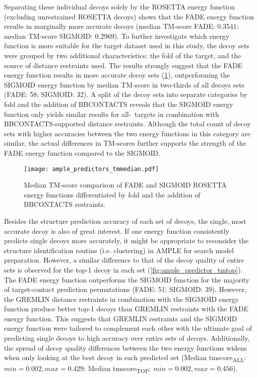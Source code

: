 Separating these individual decoys solely by the ROSETTA energy function (excluding unrestrained ROSETTA decoys) shows that the FADE energy function results in marginally more accurate decoys (median TM-score FADE: 0.3541; median TM-score SIGMOID: 0.2969). To further investigate which energy function is more suitable for the target dataset used in this study, the decoy sets were grouped by two additional characteristics: the fold of the target, and the source of distance restraints used. The results strongly suggest that the FADE energy function results in more accurate decoy sets (\cref{fig:ample_predictor_tmmedian}), outperforming the SIGMOID energy function by median TM-score in two-thirds of all decoys sets (FADE: 58; SIGMOID: 32). A split of the decoy sets into separate categories by fold and the addition of BBCONTACTS reveals that the SIGMOID energy function only yields similar results for all-\textbeta\ targets in combination with BBCONTACTS-supported distance restraints. Although the total count of decoy sets with higher accuracies between the two energy functions in this category are similar, the actual differences in TM-scores further supports the strength of the FADE energy function compared to the SIGMOID.

\begin{figure}[H]
    \centering
    \texttt{[image: ample\_predictors\_tmmedian.pdf]}
    \caption[Median TM-score comparison between ROSETTA energy functions]{Median TM-score comparison of FADE and SIGMOID ROSETTA energy functions differentiated by fold and the addition of BBCONTACTS restraints.}
    \label{fig:ample_predictor_tmmedian}
\end{figure}

Besides the structure prediction accuracy of each set of decoys, the single, most accurate decoy is also of great interest. If one energy function consistently predicts single decoys more accurately, it might be appropriate to reconsider the structure identification routine (i.e. clustering) in AMPLE for search model preparation. However, a similar difference to that of the decoy quality of entire sets is observed for the top-1 decoy in each set (\cref{fig:ample_predictor_tmtop}). The FADE energy function outperforms the SIGMOID function for the majority of target-contact prediction permutations (FADE: 51; SIGMOID: 39). However, the GREMLIN distance restraints in combination with the SIGMOID energy function produce better top-1 decoys than GREMLIN restraints with the FADE energy function. This suggests that GREMLIN restraints and the SIGMOID energy function were tailored to complement each other with the ultimate goal of predicting single decoys to high accuracy over entire sets of decoys. Additionally, the spread of decoy quality differences between the two energy functions widens when only looking at the best decoy in each predicted set (\textDelta Median \gls{tmscore}\textsubscript{ALL}: $min=0.002, max=0.429$; \textDelta Median \gls{tmscore}\textsubscript{TOP}: $min=0.002, max=0.456$). 

